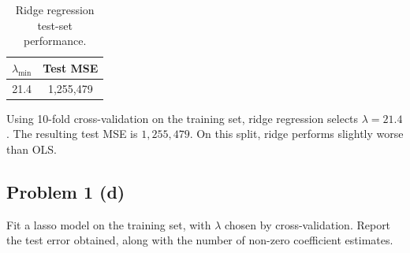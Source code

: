 \documentclass[
  10pt,
]{extarticle}
\newenvironment{Shaded}{\begin{snugshade}}{\end{snugshade}}
\newcommand{\AttributeTok}[1]{\textcolor[rgb]{0.13,0.29,0.53}{#1}}
\newcommand{\CommentTok}[1]{\textcolor[rgb]{0.56,0.35,0.01}{\textit{#1}}}
\newcommand{\DecValTok}[1]{\textcolor[rgb]{0.00,0.00,0.81}{#1}}
\newcommand{\FunctionTok}[1]{\textcolor[rgb]{0.13,0.29,0.53}{\textbf{#1}}}
\newcommand{\NormalTok}[1]{#1}
\newcommand{\OtherTok}[1]{\textcolor[rgb]{0.56,0.35,0.01}{#1}}
\newcommand{\SpecialCharTok}[1]{\textcolor[rgb]{0.81,0.36,0.00}{\textbf{#1}}}
\newcommand{\StringTok}[1]{\textcolor[rgb]{0.31,0.60,0.02}{#1}}
\begin{document}
\begin{Shaded}
\end{Shaded}

\begin{table}[H]
\centering
\caption{\label{tab:unnamed-chunk-3}Ridge regression test-set performance.}
\centering
\begin{tabular}[t]{cc}
\toprule
$\lambda_{\min}$ & Test MSE\\
\midrule
21.4 & 1,255,479\\
\bottomrule
\end{tabular}
\end{table}

Using 10-fold cross-validation on the training set, ridge regression selects \(\lambda = 21.4\). The resulting test MSE is \(\boxed{1{,}255{,}479}\). On this split, ridge performs slightly worse than OLS.

\newpage

\subsection{Problem 1 (d)}\label{problem-1-d}

\begin{problem}[Problem 1 (d)]
Fit a lasso model on the training set, with \(\lambda\) chosen by cross-validation. Report the test error obtained, along with the number of non-zero coefficient estimates.
\end{problem}
\end{document}
